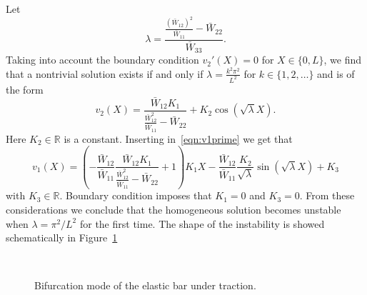 \documentclass[a4paper,10pt,twoside]{amsbook}
\numberwithin{section}{chapter}
\numberwithin{equation}{chapter}
\theoremstyle{definition}
\begin{document}
Let
\[
\lambda=\frac{\frac{(\bar W_{12})^2}{\bar W_{11}}-\bar W_{22}}{\bar W_{33}}.
\]
Taking into account the boundary condition $v_2'(X)=0$  for $X\in\{0,L\}$, we find that a nontrivial solution exists if and only if $\lambda=\frac{k^2\pi^2}{L^2}$ for $k\in\{1,2,\dots\}$ and is of the form
\[
v_2(X)=\frac{\bar W_{12}K_1}{\frac{\bar{W}_{12}^2}{\bar{W}_{11}}-\bar W_{22}}+K_2\cos\left(\sqrt{\lambda}X\right).
\]
Here $K_2\in\mathbb{R}$ is a constant. Inserting in~\eqref{eqn:v1prime} we get that
\[
v_1(X)=\left(-\frac{\bar W_{12}}{\bar W_{11}}\frac{\bar W_{12}K_1}{\frac{\bar{W}_{12}^2}{\bar{W}_{11}}-\bar W_{22}}+1\right)K_1X-\frac{\bar{W}_{12}}{\bar{W}_{11}}\frac{K_2}{\sqrt{\lambda}}\sin\left(\sqrt{\lambda}X\right)+K_3
\]
with $K_3\in\mathbb{R}$. Boundary condition imposes that $K_1=0$ and $K_3=0$. From these considerations we conclude that the homogeneous solution becomes unstable when $\lambda=\pi^2/L^2$ for the first time. The shape of the instability is showed schematically in Figure~\ref{fig:instability-mode-elastic}
\begin{figure}[t]
\centering
{}
\\
\caption{Bifurcation mode of the elastic bar under traction.}
\label{fig:instability-mode-elastic}
\end{figure}
\end{document}
